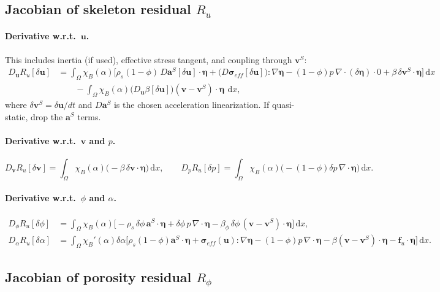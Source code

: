\documentclass[11pt]{article}
\newcommand{\dd}{\,\mathrm{d}}
\newcommand{\grad}{\nabla}
\newcommand{\divv}{\nabla\!\cdot}
\begin{document}
\subsection{Jacobian of skeleton residual $R_u$}

\paragraph{Derivative w.r.t.\ $\bm{u}$.}
This includes inertia (if used), effective stress tangent, and coupling through $\bm{v}^S$:
\begin{align}
D_{\bm{u}}R_u[\delta\bm{u}] &=
\int_\Omega \chi_B(\alpha)\Big[
\rho_s(1-\phi)\,D\bm{a}^S[\delta\bm{u}]\cdot\bm{\eta}
+ \big(D\bm{\sigma}_{eff}[\delta\bm{u}]\big):\grad\bm{\eta}
-(1-\phi)p\,\divv(\delta\bm{\eta})\cdot 0
+\beta\,\delta\bm{v}^S\cdot\bm{\eta}
\Big]\dd x
\\
&\qquad
-\int_\Omega \chi_B(\alpha)\Big(D_{\bm{u}}\beta[\delta\bm{u}]\Big)(\bm{v}-\bm{v}^S)\cdot\bm{\eta}\ \dd x,
\end{align}
where $\delta\bm{v}^S=\delta\bm{u}/dt$ and $D\bm{a}^S$ is the chosen acceleration linearization.
If quasi-static, drop the $\bm{a}^S$ terms.

\paragraph{Derivative w.r.t.\ $\bm{v}$ and $p$.}
\[
D_{\bm{v}}R_u[\delta\bm{v}] = \int_\Omega \chi_B(\alpha)\Big(-\beta\,\delta\bm{v}\cdot\bm{\eta}\Big)\dd x,
\qquad
D_p R_u[\delta p] = \int_\Omega \chi_B(\alpha)\Big(-(1-\phi)\delta p\,\divv\bm{\eta}\Big)\dd x.
\]

\paragraph{Derivative w.r.t.\ $\phi$ and $\alpha$.}
\begin{align}
D_\phi R_u[\delta\phi] &=
\int_\Omega \chi_B(\alpha)\Big[
-\rho_s\,\delta\phi\,\bm{a}^S\cdot\bm{\eta}
+\delta\phi\,p\,\divv\bm{\eta}
-\beta_\phi\,\delta\phi\,(\bm{v}-\bm{v}^S)\cdot\bm{\eta}
\Big]\dd x,
\\
D_\alpha R_u[\delta\alpha] &=
\int_\Omega \chi_B'(\alpha)\delta\alpha\Big[
\rho_s(1-\phi)\bm{a}^S\cdot\bm{\eta}
+\bm{\sigma}_{eff}(\bm{u}):\grad\bm{\eta}
-(1-\phi)p\,\divv\bm{\eta}
-\beta(\bm{v}-\bm{v}^S)\cdot\bm{\eta}
-\bm{f}_u\cdot\bm{\eta}
\Big]\dd x.
\end{align}

\subsection{Jacobian of porosity residual $R_\phi$}
\end{document}
